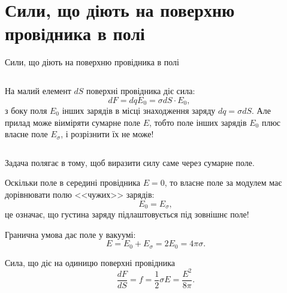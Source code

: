 \documentclass{beamer}
\begin{document}
\section{Сили, що діють на поверхню провідника в полі}




\begin{frame}{Сили, що діють на поверхню провідника в полі}{}
	\begin{columns}
		\begin{column}{0.65\linewidth}
			\begin{block}{}\justifying
				На малий елемент $dS$ поверхні провідника діє сила:
				\begin{equation*}
					dF = dq E_0 = \sigma dS \cdot  E_0,
				\end{equation*}
				з боку \alert{поля $E_0$ інших зарядів} в місці
				знаходження заряду $dq = \sigma dS$. Але прилад може віиміряти \alert{сумарне поле
					$E$}, тобто поле  \alert{інших зарядів $E_0$} плюс \alert{власне поле
					$E_{\sigma}$}, і  розрізнити їх не може!
			\end{block}
		\end{column}
		\begin{column}{0.35\linewidth}\centering
			
		\end{column}
	\end{columns}
	\begin{overprint}
		\begin{alertblock}{}\justifying
			Задача 	полягає в тому, щоб виразити силу саме через сумарне поле.
		\end{alertblock}
		\begin{block}{}\justifying
			Оскільки поле в середині провідника  $E = 0$, то власне поле за модулем має дорівнювати
			полю <<чужих>> зарядів:
			\begin{equation*}
				E_0 = E_{\sigma},
			\end{equation*}
			це означає, що \alert{густина заряду підлаштовується під зовнішнє поле}!
		\end{block}
		\begin{block}{}\justifying
			Гранична умова дає поле у вакуумі:
			\begin{equation*}
				E = E_0 + E_{\sigma} = 2 E_0 = 4\pi\sigma.
			\end{equation*}
		\end{block}
		\begin{block}{}\justifying
			Сила, що діє на одиницю поверхні провідника
			\begin{equation*}
				\frac{dF}{dS} = f = \frac12 \sigma E = \frac{E^2}{8\pi}.
			\end{equation*}
		\end{block}
	\end{overprint}
\end{frame}
\end{document}

